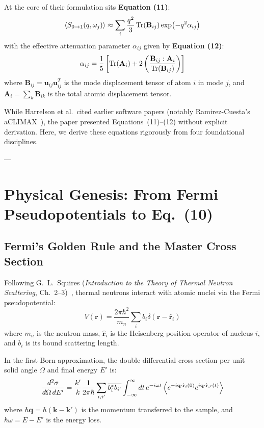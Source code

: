 \documentclass[11pt,a4paper]{article}
\theoremstyle{definition}
\begin{document}
At the core of their formulation sits \textbf{Equation (11)}:
\begin{equation}
\ev{S_{0 \to 1}(q, \omega_j)} \approx \sum_i \frac{q^2}{3} \Tr(\mathbf{B}_{ij}) \exp(-q^2 \alpha_{ij})
\label{eq:harrelson11_target}
\end{equation}
with the effective attenuation parameter $\alpha_{ij}$ given by \textbf{Equation (12)}:
\begin{equation}
\alpha_{ij} = \frac{1}{5} \left[ \Tr(\mathbf{A}_i) + 2 \left( \frac{\mathbf{B}_{ij} : \mathbf{A}_i}{\Tr(\mathbf{B}_{ij})} \right) \right]
\label{eq:harrelson12_target}
\end{equation}
where $\mathbf{B}_{ij} = \mathbf{u}_{ij} \mathbf{u}_{ij}^T$ is the mode displacement tensor of atom $i$ in mode $j$, and $\mathbf{A}_i = \sum_k \mathbf{B}_{ik}$ is the total atomic displacement tensor.

While Harrelson et al.\ cited earlier software papers (notably Ramirez-Cuesta's aCLIMAX~\cite{ramirez2004}), the paper presented Equations~(11)--(12) without explicit derivation. Here, we derive these equations rigorously from four foundational disciplines.

---

\section{Physical Genesis: From Fermi Pseudopotentials to Eq.~(10)}
\label{sec:quantum_genesis}

\subsection{Fermi's Golden Rule and the Master Cross Section}
Following G.~L.~Squires (\emph{Introduction to the Theory of Thermal Neutron Scattering}, Ch.~2--3)~\cite{squires}, thermal neutrons interact with atomic nuclei via the Fermi pseudopotential:
\begin{equation}
V(\mathbf{r}) = \frac{2\pi \hbar^2}{m_n} \sum_i b_i \delta(\mathbf{r} - \hat{\mathbf{r}}_i)
\end{equation}
where $m_n$ is the neutron mass, $\hat{\mathbf{r}}_i$ is the Heisenberg position operator of nucleus $i$, and $b_i$ is its bound scattering length.

In the first Born approximation, the double differential cross section per unit solid angle $\Omega$ and final energy $E'$ is:
\begin{equation}
\frac{d^2\sigma}{d\Omega \, dE'} = \frac{k'}{k} \frac{1}{2\pi \hbar} \sum_{i, i'} \overline{b_i^* b_{i'}} \int_{-\infty}^\infty dt \, e^{-i\omega t} \ev{e^{-i\mathbf{q}\cdot \hat{\mathbf{r}}_i(0)} e^{i\mathbf{q}\cdot \hat{\mathbf{r}}_{i'}(t)}}
\end{equation}
where $\hbar \mathbf{q} = \hbar(\mathbf{k} - \mathbf{k}')$ is the momentum transferred to the sample, and $\hbar \omega = E - E'$ is the energy loss.
\end{document}
